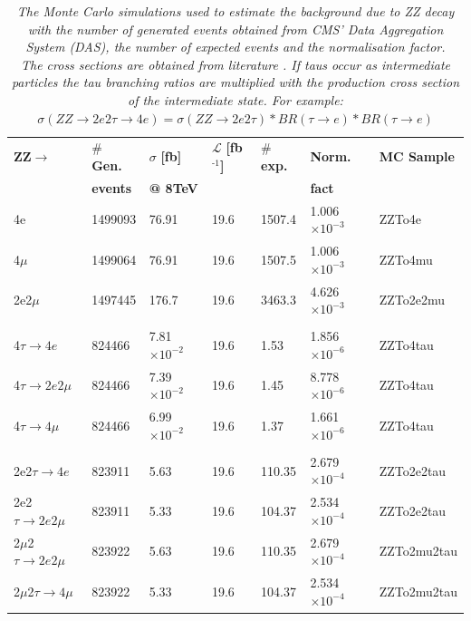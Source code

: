 \documentclass[a4paper,12pt]{article}
\newcommand{\superscript}[1]{\ensuremath{^{\textrm{#1}}}}
\begin{document}
\begin{savenotes}
\begin{table}[!hb]
	\centering
	\begin{tabular}{l | l l l | l | l | l}
		\textbf{ZZ}\boldmath$\rightarrow$  
		& \boldmath$\#$ \textbf{Gen.}	
		& \boldmath$\sigma$ \textbf{[fb]}	
		& \boldmath$\mathcal{L}$ \textbf{[fb\superscript{-1}]} 
		& \boldmath$\#$\textbf{exp.}
		& \textbf{Norm.}		
		& \textbf{MC Sample}\\
		
		&\textbf{events}
		&\textbf{@ 8TeV}
		&
		&
		&\textbf{fact}
		&\\
		\hline
		4e							& 1499093	& 76.91				& 19.6		& 1507.4	& 1.006$\times10^{-3}$ 		& ZZTo4e\\
		4$\mu$						& 1499064	& 76.91				& 19.6		& 1507.5	& 1.006$\times10^{-3}$ 		& ZZTo4mu\\
		2e2$\mu$						& 1497445	& 176.7				& 19.6		& 3463.3	& 4.626$\times10^{-3}$		& ZZTo2e2mu\\
		&&&&&\\	
		4$\tau\rightarrow4e$				& 824466		& 7.81$\times10^{-2}$	& 19.6		& 1.53	& 1.856$\times10^{-6}$ 		& ZZTo4tau\\
		4$\tau\rightarrow2e2\mu$			& 824466		& 7.39$\times10^{-2}$	& 19.6		& 1.45	& 8.778$\times10^{-6}$ 		& ZZTo4tau\\
		4$\tau\rightarrow4\mu$			& 824466		& 6.99$\times10^{-2}$	& 19.6		& 1.37	& 1.661$\times10^{-6}$ 		& ZZTo4tau\\
		&&&&&\\	
		2e2$\tau\rightarrow4e$			& 823911		& 5.63				& 19.6		& 110.35	& 2.679$\times10^{-4}$		& ZZTo2e2tau\\
		2e2$\tau\rightarrow2e2\mu$		& 823911		& 5.33				& 19.6		& 104.37	& 2.534$\times10^{-4}$		& ZZTo2e2tau\\

		2$\mu$2$\tau\rightarrow2e2\mu$	& 823922		& 5.63				& 19.6		& 110.35	& 2.679$\times10^{-4}$	 	& ZZTo2mu2tau\\
		2$\mu$2$\tau\rightarrow4\mu$		& 823922		& 5.33				& 19.6		& 104.37	& 2.534$\times10^{-4}$ 		& ZZTo2mu2tau\\

	\end{tabular}
	\caption{\emph{The Monte Carlo simulations used to estimate the background due to ZZ decay with the number of generated events obtained from CMS' Data Aggregation System (DAS), the number of expected events and the normalisation factor.
	\\The cross sections are obtained from literature \cite{analysisnote}. If taus occur as intermediate particles the tau branching ratios are multiplied with the production cross section of the intermediate state. For example: 
	\\$\sigma ( ZZ \rightarrow 2e2\tau \rightarrow 4e ) = \sigma (ZZ \rightarrow 2e2\tau) * BR (\tau \rightarrow e) * BR (\tau \rightarrow e)$}}
	\label{table:norm1}
\end{table}
\end{savenotes}
\end{document}
